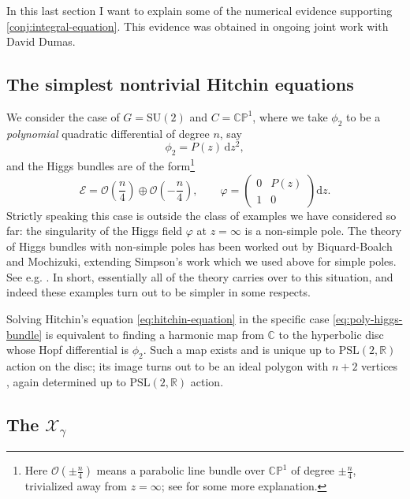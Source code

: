 \documentclass[12pt,letterpaper,reqno]{article}
\numberwithin{equation}{section}
\newcommand{\cO}{\ensuremath{\mathcal O}}
\newcommand{\cX}{\ensuremath{\mathcal X}}
\newcommand{\bbR}{\ensuremath{\mathbb R}}
\newcommand{\bbC}{\ensuremath{\mathbb C}}
\newcommand{\bbP}{\ensuremath{\mathbb P}}
\newcommand{\cE}{{\mathcal E}}
\newcommand{\de}{\mathrm{d}}
\newcommand{\ti}[1]{\textit{#1}}
\newcommand{\PSL}{\mathrm{PSL}}
\newcommand{\SU}{\mathrm{SU}}
\newcommand{\insfig}[2]{

\medskip
\noindent
\begin{minipage}{\linewidth}

\makebox[\linewidth]{\texttt{[image: figures/\#1-crop.pdf]}}

\end{minipage}
\medskip

}
\begin{document}
In this last section I want to explain some of the numerical
evidence supporting \autoref{conj:integral-equation}.
This evidence was obtained in ongoing joint work with 
David Dumas.


\subsection{The simplest nontrivial Hitchin equations}

We consider the case of $G = \SU(2)$ 
and $C = \bbC\bbP^1$, where we take $\phi_2$ to be a
\ti{polynomial} quadratic differential
of degree $n$, say
\begin{equation} \label{eq:poly-quad}
  \phi_2 = P(z) \, \de z^2,
\end{equation}
and the Higgs bundles are 
of the form\footnote{Here $\cO(\pm\frac{n}{4})$ means a parabolic line bundle 
over $\bbC\bbP^1$ of
degree $\pm \frac{n}{4}$, trivialized away from $z = \infty$; see \cite{Fredrickson2017} for some more explanation.
}
\begin{equation} \label{eq:poly-higgs-bundle}
  \cE = \cO\left(\frac{n}{4}\right) \oplus \cO\left(-\frac{n}{4}\right), \qquad \varphi = \begin{pmatrix} 0 & P(z) \\ 1 & 0 \end{pmatrix} \de z.
\end{equation}
Strictly speaking this case is outside the class of
examples we have considered so far: the singularity
of the Higgs field $\varphi$ 
at $z = \infty$ is a non-simple pole.
The theory of Higgs bundles with non-simple poles
has been worked out by Biquard-Boalch and Mochizuki, extending
Simpson's work which we used above for simple
poles. See e.g. \cite{wnh}.
In short, essentially all
of the theory carries over to this situation, and indeed
these examples turn out to be simpler in some respects.

Solving Hitchin's equation \eqref{eq:hitchin-equation} 
in the specific
case \eqref{eq:poly-higgs-bundle} is equivalent to 
finding a harmonic map from $\bbC$ to the hyperbolic disc whose  Hopf differential is $\phi_2$. Such a map exists and 
is unique up to $\PSL(2,\bbR)$ action on the disc; its image
turns out to be an ideal polygon with $n+2$ vertices
\cite{HTTW}, again determined up to $\PSL(2,\bbR)$ action.

\insfig{higgs-metric-15}{0.8}


\subsection{The \texorpdfstring{$\cX_\gamma$}{Xgamma}}
\end{document}
